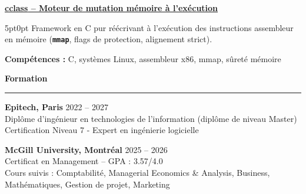 \documentclass[9pt]{extarticle}
\begin{document}
\par\vspace{8pt}

\underline{\bfseries \href{https://github.com/paulogarithm/cclass}{cclass} -- Moteur de mutation mémoire à l'exécution}
\par
\begin{adjustwidth}{5pt}{0pt}
    Framework en C pur réécrivant à l'exécution des instructions assembleur en mémoire ({\bfseries \texttt{mmap}}, flags de protection, alignement strict).
\end{adjustwidth}
\par
{\bfseries Compétences :} C, systèmes Linux, assembleur x86, mmap, sûreté mémoire

\par\vspace{8pt}

{\large\bfseries Formation}
\par\vspace{-8pt}
\rule{\linewidth}{0.4pt}
\par\vspace{5pt}

{\bfseries Epitech, Paris} \hfill 2022 -- 2027 \\
Diplôme d'ingénieur en technologies de l'information (diplôme de niveau Master) \\
Certification Niveau 7 - Expert en ingénierie logicielle

\vspace{6pt}

{\bfseries McGill University, Montréal} \hfill 2025 -- 2026 \\
Certificat en Management -- GPA : 3.57/4.0 \\
Cours suivis : Comptabilité, Managerial Economics \& Analysis, Business, Mathématiques, Gestion de projet, Marketing
\end{document}
